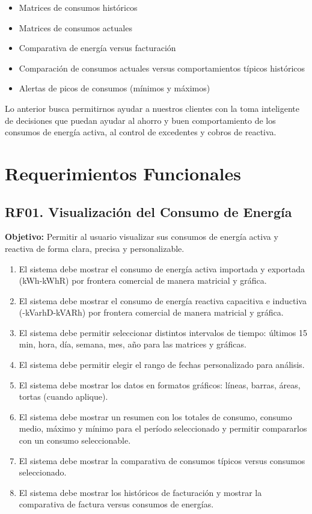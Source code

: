 \documentclass[12pt,a4paper]{article}
\begin{document}
\begin{itemize}
    \item Matrices de consumos históricos
    \item Matrices de consumos actuales
    \item Comparativa de energía versus facturación
    \item Comparación de consumos actuales versus comportamientos típicos históricos
    \item Alertas de picos de consumos (mínimos y máximos)
\end{itemize}

Lo anterior busca permitirnos ayudar a nuestros clientes con la toma inteligente de decisiones que puedan ayudar al ahorro y buen comportamiento de los consumos de energía activa, al control de excedentes y cobros de reactiva.

\section{Requerimientos Funcionales}

\subsection{RF01. Visualización del Consumo de Energía}

\textbf{Objetivo:} Permitir al usuario visualizar sus consumos de energía activa y reactiva de forma clara, precisa y personalizable.

\begin{enumerate}[label=RF01.\arabic*]
    \item El sistema debe mostrar el consumo de energía activa importada y exportada (kWh-kWhR) por frontera comercial de manera matricial y gráfica.
    \item El sistema debe mostrar el consumo de energía reactiva capacitiva e inductiva (-kVarhD-kVARh) por frontera comercial de manera matricial y gráfica.
    \item El sistema debe permitir seleccionar distintos intervalos de tiempo: últimos 15 min, hora, día, semana, mes, año para las matrices y gráficas.
    \item El sistema debe permitir elegir el rango de fechas personalizado para análisis.
    \item El sistema debe mostrar los datos en formatos gráficos: líneas, barras, áreas, tortas (cuando aplique).
    \item El sistema debe mostrar un resumen con los totales de consumo, consumo medio, máximo y mínimo para el período seleccionado y permitir compararlos con un consumo seleccionable.
    \item El sistema debe mostrar la comparativa de consumos típicos versus consumos seleccionado.
    \item El sistema debe mostrar los históricos de facturación y mostrar la comparativa de factura versus consumos de energías.
\end{enumerate}
\end{document}

